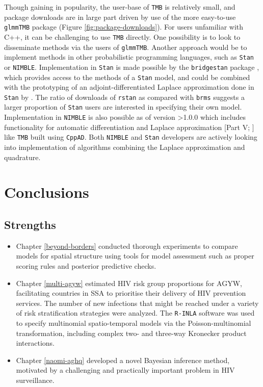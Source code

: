 \documentclass[a4paper, nobind]{templates/ociamthesis}
\begin{document}
Though gaining in popularity, the user-base of \texttt{TMB} is relatively small, and package downloads are in large part driven by use of the more easy-to-use \texttt{glmmTMB} package (Figure \ref{fig:package-downloads}).
For users unfamiliar with C++, it can be challenging to use \texttt{TMB} directly.
One possibility is to look to disseminate methods via the users of \texttt{glmmTMB}.
Another approach would be to implement methods in other probabilistic programming languages, such as \texttt{Stan} or \texttt{NIMBLE}.
Implementation in \texttt{Stan} is made possible by the \texttt{bridgestan} package \autocite{bridgestan}, which provides access to the methods of a \texttt{Stan} model, and could be combined with the prototyping of an adjoint-differentiated Laplace approximation done in \texttt{Stan} by \textcite{margossian2020hamiltonian}.
The ratio of downloads of \texttt{rstan} as compared with \texttt{brms} suggests a larger proportion of \texttt{Stan} users are interested in specifying their own model.
Implementation in \texttt{NIMBLE} is also possible as of version \textgreater1.0.0 which includes functionality for automatic differentiation and Laplace approximation {[}Part V; \textcite{nimblemanual}{]} like \texttt{TMB} built using \texttt{CppAD}.
Both \texttt{NIMBLE} and \texttt{Stan} developers are actively looking into implementation of algorithms combining the Laplace approximation and quadrature.

\hypertarget{conclusions}{%
\chapter{Conclusions}\label{conclusions}}

\adjustmtc
{}

\hypertarget{strengths}{%
\section{Strengths}\label{strengths}}

\begin{itemize}
\item
  Chapter \ref{beyond-borders} conducted thorough experiments to compare models for spatial structure using tools for model assessment such as proper scoring rules and posterior predictive checks.
\item
  Chapter \ref{multi-agyw} estimated HIV risk group proportions for AGYW, facilitating countries in SSA to prioritise their delivery of HIV prevention services.
  The number of new infections that might be reached under a variety of risk stratification strategies were analyzed.
  The \texttt{R-INLA} software was used to specify multinomial spatio-temporal models via the Poisson-multinomial transformation, including complex two- and three-way Kronecker product interactions.
\item
  Chapter \ref{naomi-aghq} developed a novel Bayesian inference method, motivated by a challenging and practically important problem in HIV surveillance.
\end{itemize}
\end{document}

